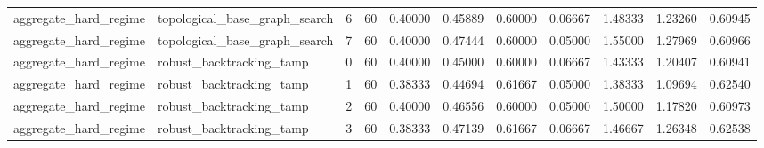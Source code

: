 \documentclass{article}
\begin{document}
\begin{table}[tbp]
{\begin{tabular}{lllllllllll}
aggregate\_hard\_regime & topological\_base\_graph\_search & 6 & 60 & 0.40000 & 0.45889 & 0.60000 & 0.06667 & 1.48333 & 1.23260 & 0.60945 \\
aggregate\_hard\_regime & topological\_base\_graph\_search & 7 & 60 & 0.40000 & 0.47444 & 0.60000 & 0.05000 & 1.55000 & 1.27969 & 0.60966 \\
aggregate\_hard\_regime & robust\_backtracking\_tamp & 0 & 60 & 0.40000 & 0.45000 & 0.60000 & 0.06667 & 1.43333 & 1.20407 & 0.60941 \\
aggregate\_hard\_regime & robust\_backtracking\_tamp & 1 & 60 & 0.38333 & 0.44694 & 0.61667 & 0.05000 & 1.38333 & 1.09694 & 0.62540 \\
aggregate\_hard\_regime & robust\_backtracking\_tamp & 2 & 60 & 0.40000 & 0.46556 & 0.60000 & 0.05000 & 1.50000 & 1.17820 & 0.60973 \\
aggregate\_hard\_regime & robust\_backtracking\_tamp & 3 & 60 & 0.38333 & 0.47139 & 0.61667 & 0.06667 & 1.46667 & 1.26348 & 0.62538 \\
\bottomrule
\end{tabular}
}
\end{table}

\clearpage
\end{document}
